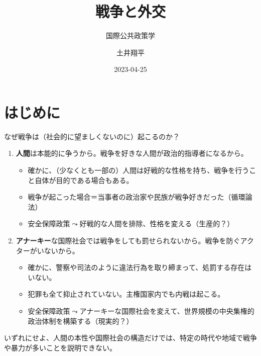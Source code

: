 \documentclass[
  xelatex,
  ja=standard]{bxjsarticle}
\title{戦争と外交}
\subtitle{国際公共政策学}
\author{土井翔平}
\date{2023-04-25}
\providecommand{\tightlist}{%
  \setlength{\itemsep}{0pt}\setlength{\parskip}{0pt}}\usepackage{longtable,booktabs,array}
\begin{document}
\maketitle
\ifdefined\Shaded\renewenvironment{Shaded}{\begin{tcolorbox}[boxrule=0pt, frame hidden, breakable, enhanced, borderline west={3pt}{0pt}{shadecolor}, sharp corners, interior hidden]}{\end{tcolorbox}}\fi

\hypertarget{ux306fux3058ux3081ux306b}{%
\section*{はじめに}\label{ux306fux3058ux3081ux306b}}

なぜ戦争は（社会的に望ましくないのに）起こるのか？

\begin{enumerate}
\def\labelenumi{\arabic{enumi}.}
\tightlist
\item
  \textbf{⼈間}は本能的に争うから。戦争を好きな⼈間が政治的指導者になるから。

  \begin{itemize}
  \tightlist
  \item
    確かに、（少なくとも一部の）人間は好戦的な性格を持ち、戦争を行うこと自体が目的である場合もある。
  \item
    戦争が起こった場合＝当事者の政治家や⺠族が戦争好きだった（循環論法）
  \item
    安全保障政策\(\leadsto\)好戦的な人間を排除、性格を変える（生産的？）
  \end{itemize}
\item
  \textbf{アナーキー}な国際社会では戦争をしても罰せられないから。戦争を防ぐアクターがいないから。

  \begin{itemize}
  \tightlist
  \item
    確かに、警察や司法のように違法行為を取り締まって、処罰する存在はいない。
  \item
    犯罪も全て抑止されていない。主権国家内でも内戦は起こる。
  \item
    安全保障政策\(\leadsto\)アナーキーな国際社会を変えて、世界規模の中央集権的政治体制を構築する（現実的？）
  \end{itemize}
\end{enumerate}

いずれにせよ、人間の本性や国際社会の構造だけでは、特定の時代や地域で戦争や暴力が多いことを説明できない。
\end{document}

